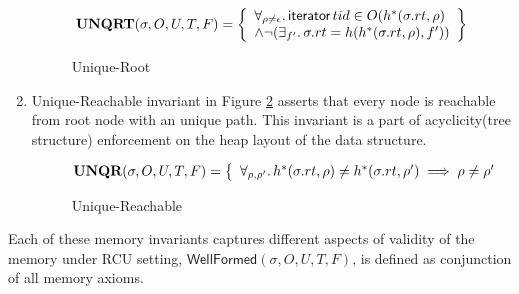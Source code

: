 \begin{enumerate}
  \begin{figure}[!htb]
\[
\textbf{UNQRT}(\sigma,O,U,T,F) =
  \left\{ \begin{array}{ll}
    \forall_{\rho \neq \epsilon} \ldotp \textsf{iterator} \, tid \in O( h^{*}(\sigma.rt,\rho)\\
    \land \lnot(\exists_{f'} \ldotp \sigma.rt = h( h^{*}(\sigma.rt,\rho),f'))
\end{array} \right\}
\]
    \caption{Unique-Root}
\label{fig:uroot}
\end{figure}
\item{Unique-Reachable} invariant in Figure \ref{fig:upath} asserts that every node is reachable from root node with an unique path. This invariant is a part of acyclicity(tree structure) enforcement on the heap layout of the data structure.
  \begin{figure}[!htb]
\[
\textbf{UNQR}(\sigma,O,U,T,F) =
\left\{
\begin{array}{ll}
    \forall_{\rho, \rho'}  \ldotp  h^{*}(\sigma.rt,\rho) \neq h^{*}(\sigma.rt, \rho') \implies  \rho \neq \rho' 
\end{array}
\right.%
\]
\caption{Unique-Reachable}
\label{fig:upath}
\end{figure}
\end{enumerate}
 Each of these memory invariants captures different aspects of validity of the memory under \textsf{RCU} setting, $\textsf{WellFormed}(\sigma,O,U,T,F) $, is defined as conjunction of all memory axioms.

